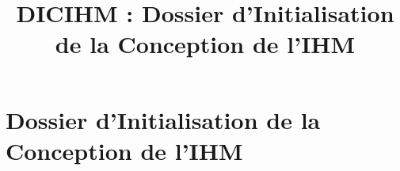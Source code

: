

\title{DICIHM : Dossier d'Initialisation de la Conception de l'IHM}


\maketitle
\tableofcontents
\newpage

\part{Dossier d'Initialisation de la Conception de l'IHM}

\newpage


